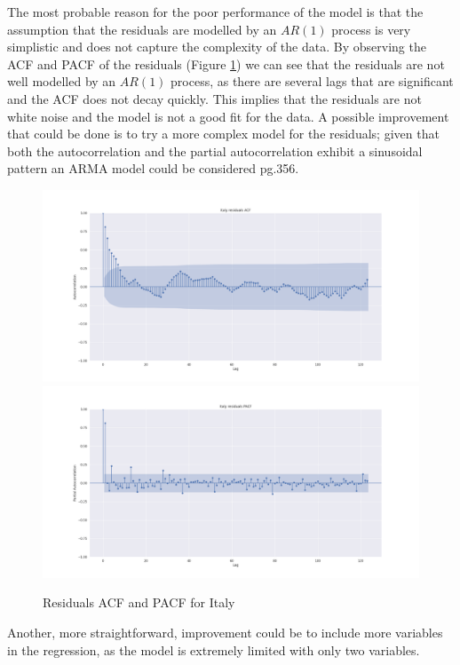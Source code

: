 The most probable reason for the poor performance of the model is that the assumption that the residuals are modelled by an $AR(1)$ process is very simplistic and does not capture the complexity of the data. By observing the ACF and PACF of the residuals (Figure \ref{fig:italy_res_corr}) we can see that the residuals are not well modelled by an $AR(1)$ process, as there are several lags that are significant and the ACF does not decay quickly. This implies that the residuals are not white noise and the model is not a good fit for the data. A possible improvement that could be done is to try a more complex model for the residuals; given that both the autocorrelation and the partial autocorrelation exhibit a sinusoidal pattern an ARMA model could be considered \cite{ts_intro}pg.356.
\begin{figure}[H]
  \includegraphics[width=.9\linewidth]{imgs/italy_res_acf.png}
  \includegraphics[width=.9\linewidth]{imgs/italy_res_pacf.png}
  \caption{Residuals ACF and PACF for Italy}
  \label{fig:italy_res_corr}
\end{figure}

Another, more straightforward, improvement could be to include more variables in the regression, as the model is extremely limited with only two variables.
